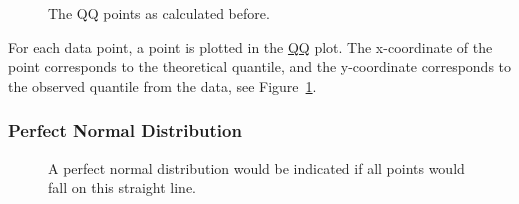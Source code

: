 \documentclass[
  a4paper,
]{scrbook}
\begin{document}
\begin{figure}[H]


\caption{\label{fig-qq-pts}The QQ points as calculated before.}

\end{figure}%

For each data point, a point is plotted in the \hyperref[qq]{QQ} plot.
The x-coordinate of the point corresponds to the theoretical quantile,
and the y-coordinate corresponds to the observed quantile from the data,
see Figure~\ref{fig-qq-pts}.

\subsubsection{Perfect Normal
Distribution}\label{perfect-normal-distribution}

\begin{figure}[H]


\caption{\label{fig-qq-abline}A perfect normal distribution would be
indicated if all points would fall on this straight line.}

\end{figure}%
\end{document}
